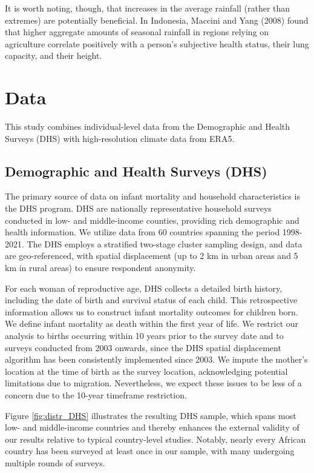\documentclass[a4paper]{article}
\begin{document}
It is worth noting, though, that increases in the average rainfall (rather than extremes) are potentially beneficial. In Indonesia, Maccini and Yang (2008) found that higher aggregate amounts of seasonal rainfall in regions relying on agriculture correlate positively with a person's subjective health status, their lung capacity, and their height. 

\section{Data} \label{sec:data}

This study combines individual-level data from the Demographic and Health Surveys (DHS) with high-resolution climate data from ERA5.

\subsection{Demographic and Health Surveys (DHS)}

The primary source of data on infant mortality and household characteristics is the DHS program.  DHS are nationally representative household surveys conducted in low- and middle-income counties, providing rich demographic and health information. We utilize data from 60 countries spanning the period 1998-2021. The DHS employs a stratified two-stage cluster sampling design, and data are geo-referenced, with spatial displacement (up to 2 km in urban areas and 5 km in rural areas) to ensure respondent anonymity.

For each woman of reproductive age, DHS collects a detailed birth history, including the date of birth and survival status of each child. This retrospective information allows us to construct infant mortality outcomes for children born.  We define infant mortality as death within the first year of life. We restrict our analysis to births occurring within 10 years prior to the survey date and to surveys conducted from 2003 onwards, since the DHS spatial displacement algorithm has been consistently implemented since 2003.  We impute the mother's location at the time of birth as the survey location, acknowledging potential limitations due to migration. Nevertheless, we expect these issues to be less of a concern due to the 10-year timeframe restriction.

Figure \ref{fig:distr_DHS} illustrates the resulting DHS sample, which spans most low- and middle-income countries and thereby enhances the external validity of our results relative to typical country-level studies. Notably, nearly every African country has been surveyed at least once in our sample, with many undergoing multiple rounds of surveys.
\end{document}
